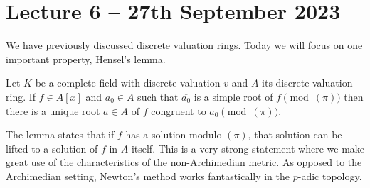 \section{Lecture 6 -- 27th September 2023}
We have previously discussed discrete valuation rings. Today we will focus on one important property, Hensel's lemma. 
\begin{lemma}[Hensel I]\label{lem: Hensel I}
  Let $K$ be a complete field with discrete valuation $v$ and $A$ its discrete valuation ring. If $f\in A[x]$ and $a_{0}\in A$ such that $\overline{a_{0}}$ is a simple root of $\overline{f}\pmod{(\pi)}$ then there is a unique root $a\in A$ of $f$ congruent to $\overline{a_{0}}\pmod{(\pi)}$. 
\end{lemma}
The lemma states that if $f$ has a solution modulo $(\pi)$, that solution can be lifted to a solution of $f$ in $A$ itself. This is a very strong statement where we make great use of the characteristics of the non-Archimedian metric. As opposed to the Archimedian setting, Newton's method works fantastically in the $p$-adic topology. 
